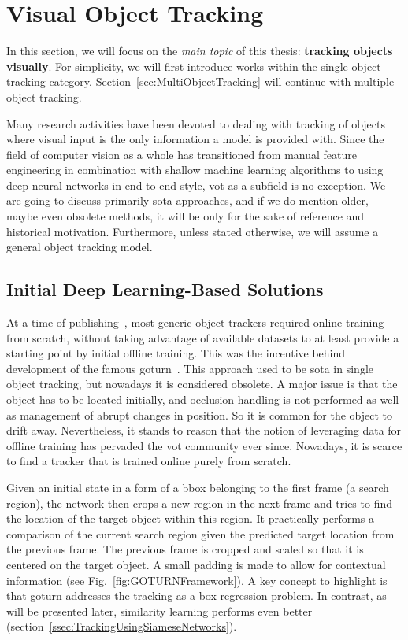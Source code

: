 \section{Visual Object Tracking}
\label{sec:VisualObjectTracking}

In this section, we will focus on the \emph{main topic} of this thesis: \textbf{tracking objects visually}. For simplicity, we will first introduce works within the single object tracking category. Section~\ref{sec:MultiObjectTracking} will continue with multiple object tracking.

Many research activities have been devoted to dealing with tracking of objects where visual input is the only information a model is provided with. Since the field of computer vision as a whole has transitioned from manual feature engineering in combination with shallow machine learning algorithms to using deep neural networks in end-to-end style, \gls{vot} as a subfield is no exception. We are going to discuss primarily \gls{sota} approaches, and if we do mention older, maybe even obsolete methods, it will be only for the sake of reference and historical motivation. Furthermore, unless stated otherwise, we will assume a general object tracking model.

\subsection{Initial Deep Learning-Based Solutions}
\label{ssec:InitialDeepLearningBasedSolutions}

At a time of publishing~\cite{Held2016}, most generic object trackers required online training from scratch, without taking advantage of available datasets to at least provide a starting point by initial offline training. This was the incentive behind development of the famous \gls{goturn}~\cite{Held2016}. This approach used to be \gls{sota} in single object tracking, but nowadays it is considered obsolete. A major issue is that the object has to be located initially, and occlusion handling is not performed as well as management of abrupt changes in position. So it is common for the object to drift away. Nevertheless, it stands to reason that the notion of leveraging data for offline training has pervaded the \gls{vot} community ever since. Nowadays, it is scarce to find a tracker that is trained online purely from scratch.

Given an initial state in a form of a \gls{bbox} belonging to the first frame (a search region), the network then crops a new region in the next frame and tries to find the location of the target object within this region. It practically performs a comparison of the current search region given the predicted target location from the previous frame. The previous frame is cropped and scaled so that it is centered on the target object. A small padding is made to allow for contextual information (see Fig.~\ref{fig:GOTURNFramework}). A key concept to highlight is that \gls{goturn} addresses the tracking as a box regression problem. In contrast, as will be presented later, similarity learning performs even better (section~\ref{ssec:TrackingUsingSiameseNetworks}).

